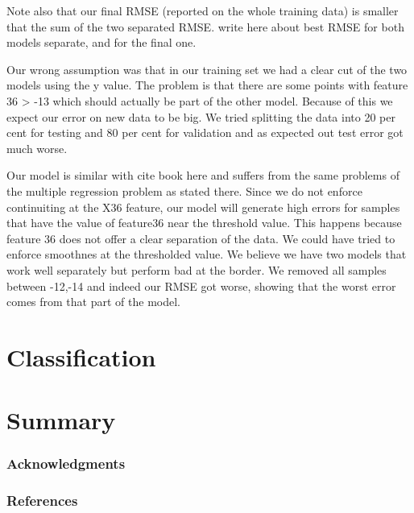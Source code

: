 \documentclass{article} %
\begin{document}
Note also that our final RMSE (reported on the whole training data) is smaller that the sum of the two separated RMSE.
{write here about best RMSE for both models separate, and for the final one.}

Our wrong assumption was that in our training set we had a clear cut of the two models using the y value. The problem is that there are some points  with feature 36 > -13 which should actually be part of the other model. Because of this we expect our error on new data to be big.
We tried splitting the data into 20 per cent for testing and 80 per cent for validation and as expected out test error got much worse.

Our model is similar with cite book here and suffers from the same problems of the multiple regression problem as stated there.
Since we do not enforce continuiting at the X36 feature, our model will generate high errors for samples that have the value of feature36 near the threshold value. This happens because feature 36 does not offer a clear separation of the data. We could have tried to enforce smoothnes at the thresholded value. We believe we have two models that work well separately but perform bad at the border. We removed all samples between -12,-14 and indeed our RMSE got worse, showing that the worst error comes from that part of the model.


\section{Classification}





\section{Summary}


\subsubsection*{Acknowledgments}

\subsubsection*{References}
\end{document}
